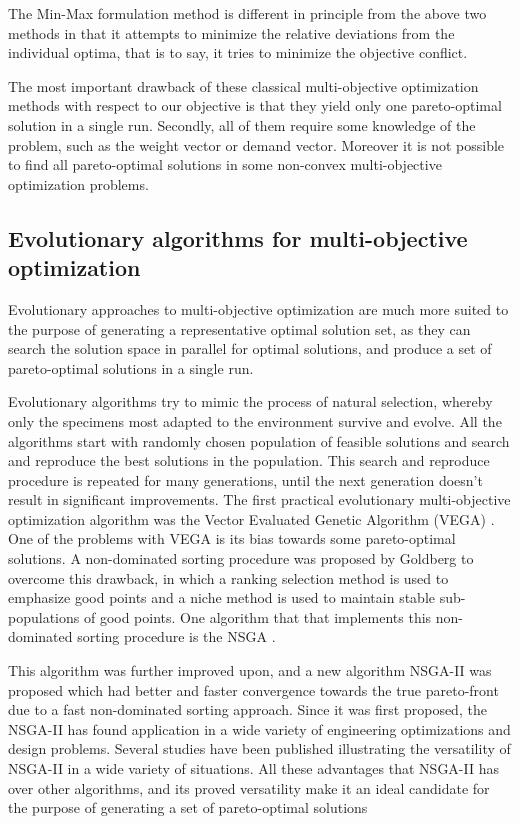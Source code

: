 The Min-Max formulation method is different in principle from the above two
methods in that it attempts to minimize the relative deviations from the
individual optima, that is to say, it tries to minimize the objective
conflict.

The most important drawback of these classical multi-objective optimization
methods with respect to our objective is that they yield only one
pareto-optimal solution in a single run. Secondly, all of them require some
knowledge of the problem, such as the weight vector or demand
vector. Moreover it is not possible to find all pareto-optimal solutions in
some non-convex multi-objective optimization problems.

\subsection{Evolutionary algorithms for multi-objective optimization}
Evolutionary approaches to multi-objective optimization are much more
suited to the purpose of generating a representative optimal solution set,
as they can search the solution space in parallel for optimal solutions,
and produce a set of pareto-optimal solutions in a single run.

Evolutionary algorithms try to mimic the process of natural selection,
whereby only the specimens most adapted to the environment survive and
evolve. All the algorithms start with randomly chosen population of
feasible solutions and search and reproduce the best solutions in the
population. This search and reproduce procedure is repeated for many
generations, until the next generation doesn't result in significant
improvements. The first practical evolutionary multi-objective optimization
algorithm was the Vector Evaluated Genetic Algorithm (VEGA)
\citep{schaffer85}. One of the problems with VEGA is its bias towards some
pareto-optimal solutions. A non-dominated sorting procedure was proposed by
Goldberg to overcome this drawback, in which a ranking selection method is
used to emphasize good points and a niche method is used to maintain stable
sub-populations of good points.  One algorithm that that implements this
non-dominated sorting procedure is the NSGA \citep{deb94}.

This algorithm was further improved upon, and a new algorithm NSGA-II
\citep{deb02} was proposed which had better and faster convergence towards
the true pareto-front due to a fast non-dominated sorting approach. Since
it was first proposed, the NSGA-II has found application in a wide variety
of engineering optimizations and design problems. Several studies have been
published illustrating the versatility of NSGA-II in a wide variety of
situations. All these advantages that NSGA-II has over other algorithms,
and its proved versatility make it an ideal candidate for the purpose of
generating a set of pareto-optimal solutions

